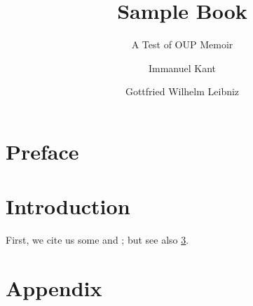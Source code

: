 \documentclass[print]{oupmemoir}
\title{Sample Book}
\subtitle{A Test of OUP Memoir}
\author{Immanuel Kant\and Gottfried Wilhelm Leibniz}
\begin{document}
\maketitle

\tableofcontents*

\indexoff %

\chapter{Preface}

\kant[1-5] %

\indexon

\mainmatter

\chapter{Introduction}

First, we cite us some \citet{Kant1746} and
\citet{Leibniz1890,Leibniz1858a}; but see also \cref{app}.

\kant[6-20]

\appendix

\chapter{Appendix}\label{app}

\kant[11-13]

\backmatter


\indexoff 

\printbibliography

% 

\printindex
\end{document}
